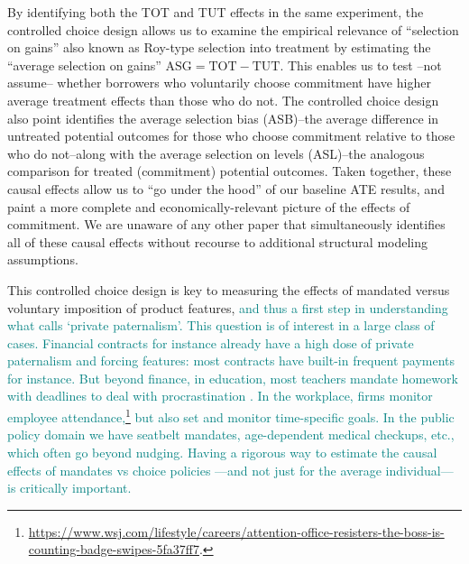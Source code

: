 \documentclass[oneside,11pt]{article}
\begin{document}
By identifying both the TOT and TUT effects in the same experiment, the controlled choice design allows us to examine the empirical relevance of ``selection on gains'' also known as Roy-type selection into treatment by estimating the ``average selection on gains'' $\text{ASG} = \text{TOT} - \text{TUT}$. This enables us to test --not assume-- whether borrowers who voluntarily choose commitment have higher average treatment effects than those who do not. The controlled choice design also point identifies the average selection bias (ASB)--the average difference in untreated potential outcomes for those who choose commitment relative to those who do not--along with the average selection on levels (ASL)--the analogous comparison for treated (commitment) potential outcomes. Taken together, these causal effects allow us to ``go under the hood'' of our baseline ATE results, and paint a more complete and economically-relevant picture of the effects of commitment. We are unaware of any other paper that simultaneously identifies all of these causal effects without recourse to additional structural modeling assumptions. 

This controlled choice design is key to measuring the effects of mandated versus voluntary imposition of product features, \textcolor{teal}{and thus a first step in understanding what \cite{Laibson2018} calls `private paternalism'.  This question is of interest in a large class of cases. Financial contracts for instance already have a high dose of private paternalism and forcing features: most contracts have built-in frequent payments for instance. But beyond finance, in education, most teachers mandate homework with deadlines to deal with procrastination \citep{Ariely}. In the workplace, firms monitor employee attendance,\footnote{\url{https://www.wsj.com/lifestyle/careers/attention-office-resisters-the-boss-is-counting-badge-swipes-5fa37ff7}.} but also set and monitor time-specific goals. In the public policy domain we have seatbelt mandates, age-dependent medical checkups, etc., which often go beyond nudging. Having a rigorous way to estimate the causal effects of mandates vs choice policies ---and not just for the average individual--- is critically important.} 
\end{document}
